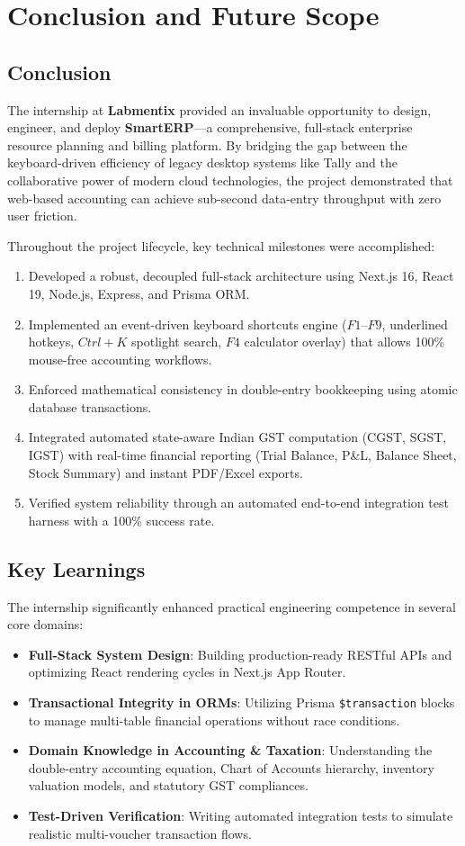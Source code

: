 \chapter{Conclusion and Future Scope}

\section{Conclusion}
The internship at \textbf{Labmentix} provided an invaluable opportunity to design, engineer, and deploy \textbf{SmartERP}---a comprehensive, full-stack enterprise resource planning and billing platform. By bridging the gap between the keyboard-driven efficiency of legacy desktop systems like Tally and the collaborative power of modern cloud technologies, the project demonstrated that web-based accounting can achieve sub-second data-entry throughput with zero user friction.

Throughout the project lifecycle, key technical milestones were accomplished:
\begin{enumerate}
    \item Developed a robust, decoupled full-stack architecture using Next.js 16, React 19, Node.js, Express, and Prisma ORM.
    \item Implemented an event-driven keyboard shortcuts engine ($F1$--$F9$, underlined hotkeys, $Ctrl+K$ spotlight search, $F4$ calculator overlay) that allows 100\% mouse-free accounting workflows.
    \item Enforced mathematical consistency in double-entry bookkeeping using atomic database transactions.
    \item Integrated automated state-aware Indian GST computation (CGST, SGST, IGST) with real-time financial reporting (Trial Balance, P\&L, Balance Sheet, Stock Summary) and instant PDF/Excel exports.
    \item Verified system reliability through an automated end-to-end integration test harness with a 100\% success rate.
\end{enumerate}

\section{Key Learnings}
The internship significantly enhanced practical engineering competence in several core domains:
\begin{itemize}
    \item \textbf{Full-Stack System Design}: Building production-ready RESTful APIs and optimizing React rendering cycles in Next.js App Router.
    \item \textbf{Transactional Integrity in ORMs}: Utilizing Prisma \texttt{\$transaction} blocks to manage multi-table financial operations without race conditions.
    \item \textbf{Domain Knowledge in Accounting \& Taxation}: Understanding the double-entry accounting equation, Chart of Accounts hierarchy, inventory valuation models, and statutory GST compliances.
    \item \textbf{Test-Driven Verification}: Writing automated integration tests to simulate realistic multi-voucher transaction flows.
\end{itemize}

